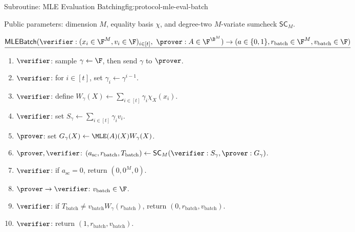 \begin{protocolbox}{Subroutine: MLE Evaluation Batching}{fig:protocol-mle-eval-batch}
\scriptsize\raggedright
\noindent Public parameters: dimension \(M\), equality basis \(\chi\), and
degree-two \(M\)-variate sumcheck \(\mathsf{SC}_M\).

\smallskip
\noindent\(\underline{\mathsf{MLEBatch}(\verifier:(x_i\in\F^M,v_i\in\F)_{i\in[t]},\ \prover:A\in\F^{\B^M})\to(a\in\{0,1\},r_{\mathrm{batch}}\in\F^M,v_{\mathrm{batch}}\in\F)}\)

\smallskip
\begin{enumerate}[leftmargin=0.24in,label=\textbf{M\arabic*.},itemsep=0.06em,topsep=0.06em,parsep=0pt]
  \item \(\verifier\): sample \(\gamma\leftarrow\F\), then send
        \(\gamma\) to \(\prover\).
  \item \(\verifier\): for \(i\in[t]\), set \(\gamma_i\gets\gamma^{i-1}\).
  \item \(\verifier\): define
        \(W_\gamma(X)\gets\sum_{i\in[t]}\gamma_i\chi_X(x_i)\).
  \item \(\verifier\): set
        \(S_\gamma\gets\sum_{i\in[t]}\gamma_i v_i\).
  \item \(\prover\): set
        \(G_\gamma(X)\gets\MLE(A)(X)W_\gamma(X)\).
  \item \(\prover,\verifier\):
        \((a_{\mathrm{sc}},r_{\mathrm{batch}},T_{\mathrm{batch}})
        \gets\mathsf{SC}_M(\verifier:S_\gamma,\prover:G_\gamma)\).
  \item \(\verifier\): if \(a_{\mathrm{sc}}=0\), return
        \((0,0^M,0)\).
  \item \(\prover\to\verifier\): \(v_{\mathrm{batch}}\in\F\).
  \item \(\verifier\): if
        \(T_{\mathrm{batch}}\ne v_{\mathrm{batch}}W_\gamma(r_{\mathrm{batch}})\),
        return \((0,r_{\mathrm{batch}},v_{\mathrm{batch}})\).
  \item \(\verifier\): return \((1,r_{\mathrm{batch}},v_{\mathrm{batch}})\).
\end{enumerate}
\end{protocolbox}

